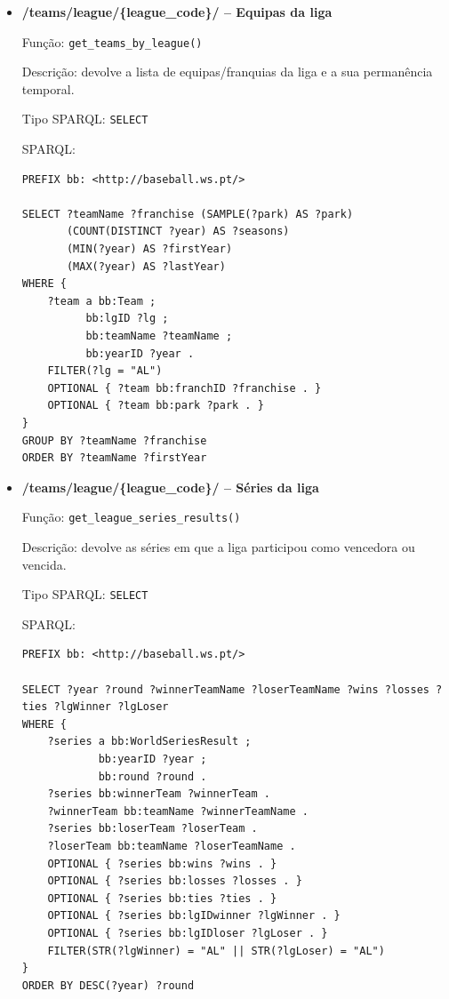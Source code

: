 \begin{itemize}[leftmargin=*]
  \item \textbf{/teams/league/\{league\_code\}/ -- Equipas da liga}
  
  Fun\c{c}\~ao: \texttt{get\_teams\_by\_league()}
  
  Descri\c{c}\~ao: devolve a lista de equipas/franquias da liga e a sua perman\^encia temporal.
  
  Tipo SPARQL: \texttt{SELECT}

  SPARQL:

\begin{Verbatim}[fontsize=\scriptsize,breaklines=true]
PREFIX bb: <http://baseball.ws.pt/>

SELECT ?teamName ?franchise (SAMPLE(?park) AS ?park)
       (COUNT(DISTINCT ?year) AS ?seasons)
       (MIN(?year) AS ?firstYear)
       (MAX(?year) AS ?lastYear)
WHERE {
    ?team a bb:Team ;
          bb:lgID ?lg ;
          bb:teamName ?teamName ;
          bb:yearID ?year .
    FILTER(?lg = "AL")
    OPTIONAL { ?team bb:franchID ?franchise . }
    OPTIONAL { ?team bb:park ?park . }
}
GROUP BY ?teamName ?franchise
ORDER BY ?teamName ?firstYear
\end{Verbatim}

  \item \textbf{/teams/league/\{league\_code\}/ -- S\'eries da liga}
  
  Fun\c{c}\~ao: \texttt{get\_league\_series\_results()}
  
  Descri\c{c}\~ao: devolve as séries em que a liga participou como vencedora ou vencida.
  
  Tipo SPARQL: \texttt{SELECT}

  SPARQL:

\begin{Verbatim}[fontsize=\scriptsize,breaklines=true]
PREFIX bb: <http://baseball.ws.pt/>

SELECT ?year ?round ?winnerTeamName ?loserTeamName ?wins ?losses ?ties ?lgWinner ?lgLoser
WHERE {
    ?series a bb:WorldSeriesResult ;
            bb:yearID ?year ;
            bb:round ?round .
    ?series bb:winnerTeam ?winnerTeam .
    ?winnerTeam bb:teamName ?winnerTeamName .
    ?series bb:loserTeam ?loserTeam .
    ?loserTeam bb:teamName ?loserTeamName .
    OPTIONAL { ?series bb:wins ?wins . }
    OPTIONAL { ?series bb:losses ?losses . }
    OPTIONAL { ?series bb:ties ?ties . }
    OPTIONAL { ?series bb:lgIDwinner ?lgWinner . }
    OPTIONAL { ?series bb:lgIDloser ?lgLoser . }
    FILTER(STR(?lgWinner) = "AL" || STR(?lgLoser) = "AL")
}
ORDER BY DESC(?year) ?round
\end{Verbatim}


\end{itemize}
